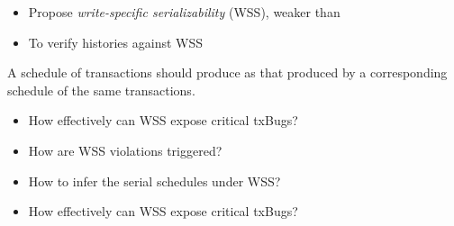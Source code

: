 
\begin{frame}{}
	\begin{center}

		\vspace{0.30cm}
		\begin{itemize}
			\setlength{\itemsep}{8pt}
			\item Propose \emph{write-specific serializability} (WSS), weaker than \ser
			\item To verify histories against WSS
		\end{itemize}
	\end{center}
\end{frame}

\begin{frame}{}
\end{frame}

\begin{frame}{}
	\begin{definition}
		A schedule of  transactions
		should produce 
		as that produced by a corresponding  schedule
		of the same transactions.
	\end{definition}

	\pause
	\vspace{0.30cm}
	\begin{itemize}
		\setlength{\itemsep}{8pt}
		\item How effectively can WSS expose critical txBugs?
		\item How are WSS violations triggered?
		\item How to infer the serial schedules under WSS?
	\end{itemize}
\end{frame}

\begin{frame}{}
	\begin{itemize}
		\centering
		\item How effectively can WSS expose critical txBugs?
	\end{itemize}

\end{frame}

